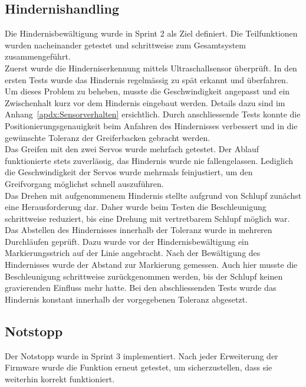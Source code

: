 \documentclass[main.tex]{subfiles} %
\begin{document}
\subsection*{Hindernishandling}
Die Hindernisbewältigung wurde in Sprint 2 als Ziel definiert. Die Teilfunktionen wurden nacheinander getestet und schrittweise zum Gesamtsystem zusammengeführt.\\
Zuerst wurde die Hinderniserkennung mittels Ultraschallsensor überprüft. In den ersten Tests wurde das Hindernis regelmässig zu spät erkannt
und überfahren. Um dieses Problem zu beheben, musste die Geschwindigkeit angepasst und ein Zwischenhalt kurz vor dem Hindernis eingebaut werden.
Details dazu sind im Anhang~\ref{apdx:Sensorverhalten} ersichtlich. Durch anschliessende Tests konnte die Positionierungsgenauigkeit beim Anfahren
des Hindernisses verbessert und in die gewünschte Toleranz der Greiferbacken gebracht werden.\\
Das Greifen mit den zwei Servos wurde mehrfach getestet. Der Ablauf funktionierte stets zuverlässig, das Hindernis wurde nie fallengelassen.
Lediglich die Geschwindigkeit der Servos wurde mehrmals feinjustiert, um den Greifvorgang möglichst schnell auszuführen.\\
Das Drehen mit aufgenommenem Hindernis stellte aufgrund von Schlupf zunächst eine Herausforderung dar. Daher wurde beim Testen die Beschleunigung schrittweise
reduziert, bis eine Drehung mit vertretbarem Schlupf möglich war.\\
Das Abstellen des Hindernisses innerhalb der Toleranz wurde in mehreren Durchläufen geprüft. Dazu wurde vor der Hindernisbewältigung ein Markierungsstrich
auf der Linie angebracht. Nach der Bewältigung des Hindernisses wurde der Abstand zur Markierung gemessen. Auch hier musste die Beschleunigung schrittweise
zurückgenommen werden, bis der Schlupf keinen gravierenden Einfluss mehr hatte. Bei den abschliessenden Tests wurde das Hindernis konstant innerhalb der
vorgegebenen Toleranz abgesetzt.

\subsection*{Notstopp}
Der Notstopp wurde in Sprint 3 implementiert. Nach jeder Erweiterung der Firmware wurde die Funktion erneut getestet, um sicherzustellen,
dass sie weiterhin korrekt funktioniert.
\end{document}
